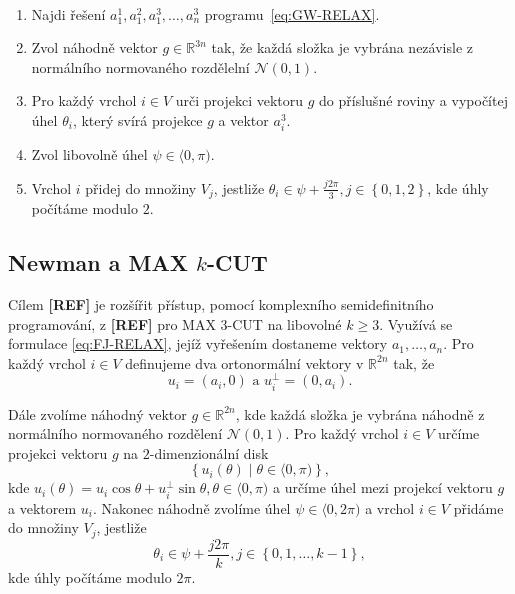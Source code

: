 \begin{alg}$ $
    \begin{enumerate}
        \item Najdi řešení $a_1^1, a_1^2, a_1^3, \dots, a_n^3$ programu~\ref{eq:GW-RELAX}.
        \item Zvol náhodně vektor $g \in \mathbb{R}^{3n}$ tak, že každá složka je vybrána nezávisle z normálního normovaného rozdělelní $\mathcal{N}(0,1)$.
        \item Pro každý vrchol $i \in V$ urči projekci vektoru $g$ do příslušné roviny a vypočítej úhel $\theta_i$, který svírá projekce $g$ a vektor $a_i^3$.
        \item Zvol libovolně úhel $\psi \in \langle 0, \pi)$.
        \item Vrchol $i$ přidej do množiny $V_j$, jestliže $\theta_i \in \psi + \frac{j 2 \pi}{3}, j \in \left\{ 0, 1, 2 \right\}$, kde úhly počítáme modulo $2$.
    \end{enumerate}
    \label{alg:gw-max-3-cut}
\end{alg}


\subsection{Newman a MAX $k$-CUT}

Cílem \textbf{[REF]} je rozšířit přístup, pomocí komplexního semidefinitního programování, z \textbf{[REF]} pro MAX $3$-CUT na libovolné $k \geq 3$. Využívá se formulace \ref{eq:FJ-RELAX}, jejíž vyřešením dostaneme vektory $a_1, \dots, a_n$. Pro každý vrchol $i \in V$ definujeme dva ortonormální vektory v $\mathbb{R}^{2n}$ tak, že
$$
    u_i = \left( a_i, 0 \right) \text{ a } u_i^\bot = \left( 0, a_i \right).
$$

\noindent Dále zvolíme náhodný vektor $g \in \mathbb{R}^{2n}$, kde každá složka je vybrána náhodně z normálního normovaného rozdělení $\mathcal{N}(0,1)$. Pro každý vrchol $i \in V$ určíme projekci vektoru $g$ na $2$-dimenzionální disk
$$
    \left\{ u_i(\theta) \mid \theta \in \langle 0, \pi ) \right\},
$$
kde $u_i(\theta) = u_i \cos \theta + u_i^\bot \sin \theta, \theta \in \langle 0, \pi)$ a určíme úhel mezi projekcí vektoru $g$ a vektorem $u_i$. Nakonec náhodně zvolíme úhel $\psi \in \langle 0, 2 \pi )$ a vrchol $i \in V$ přidáme do množiny $V_j$, jestliže
$$
    \theta_i \in \psi + \frac{j 2 \pi}{k}, j \in \left\{ 0, 1, \dots, k-1 \right\},
$$
kde úhly počítáme modulo $2\pi$.

